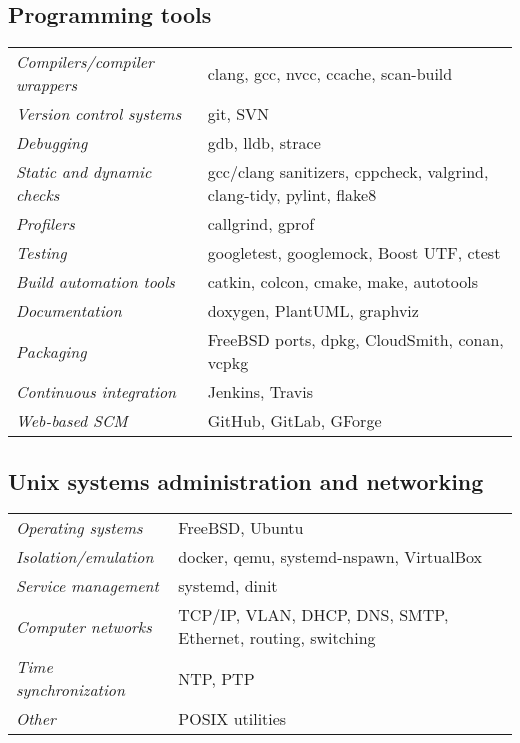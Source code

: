 \documentclass[a4paper,10pt]{report}
\begin{document}
\begin{adjustwidth}{0.5cm}{0pt}
\subsection{Programming tools}
\begin{adjustwidth}{0.5cm}{0pt}
    \begin{tabularx}{\linewidth}{l X}
        {\it Compilers/compiler wrappers}   & clang, gcc, nvcc, ccache, scan-build \\
        {\it Version control systems}       & git, SVN \\
        {\it Debugging}                     & gdb, lldb, strace \\
        {\it Static and dynamic checks}     & gcc/clang sanitizers, cppcheck, valgrind, clang-tidy, pylint, flake8 \\
        {\it Profilers}                     & callgrind, gprof \\
        {\it Testing}                       & googletest, googlemock, Boost UTF, ctest \\
        {\it Build automation tools}        & catkin, colcon, cmake, make, autotools \\
        {\it Documentation}                 & doxygen, PlantUML, graphviz \\
        {\it Packaging}                     & FreeBSD ports, dpkg, CloudSmith, conan, vcpkg \\
        {\it Continuous integration}        & Jenkins, Travis \\
        {\it Web-based SCM}                 & GitHub, GitLab, GForge
    \end{tabularx}
\end{adjustwidth}

\subsection{Unix systems administration and networking}
\begin{adjustwidth}{0.5cm}{0pt}
    \begin{tabularx}{\linewidth}{l X}
        {\it Operating systems}             & FreeBSD, Ubuntu\\
        {\it Isolation/emulation}           & docker, qemu, systemd-nspawn, VirtualBox\\
        {\it Service management}            & systemd, dinit\\
        {\it Computer networks}             & TCP/IP, VLAN, DHCP, DNS, SMTP, Ethernet, routing, switching\\
        {\it Time synchronization}          & NTP, PTP\\
        {\it Other}                         & POSIX utilities
    \end{tabularx}
\end{adjustwidth}


\end{adjustwidth}
\end{document}
